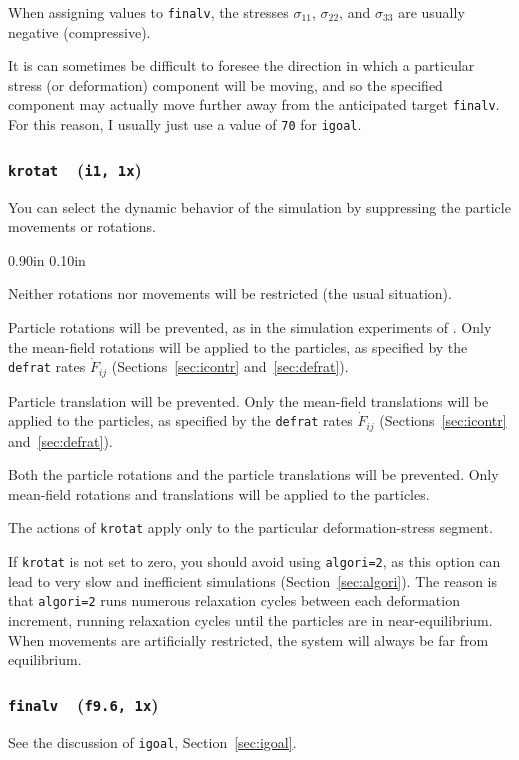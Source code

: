 \documentclass[letterpaper,11pt]{article}
\newcommand{\Var}[2]{\texttt{#1}\ \  (\texttt{#2})}
\newlength{\Labelwidth}
\newcommand{\Entrylabel}[1]{\makebox[\Labelwidth][r]{\texttt{#1}}}
\newenvironment{Options}
{\begin{list}{}{%
\renewcommand{\makelabel}{\Entrylabel}%
\setlength{\leftmargin} {0.90in}%
\setlength{\rightmargin}{0.00in}%
\setlength{\labelsep}   {0.10in}%
\setlength{\labelwidth} {\Labelwidth}%
}}
{\end{list}}
\begin{document}
When assigning values to \texttt{finalv}, the stresses $\sigma_{11}$,
$\sigma_{22}$, and $\sigma_{33}$ are usually negative (compressive).
\par
It is can sometimes be difficult to foresee the direction in which
a particular stress (or deformation) component will be moving,
and so the specified component may actually move further 
away from the anticipated target \texttt{finalv}.
For this reason, I usually just use a value of \texttt{70}
for \texttt{igoal}.
%
\subsubsection[\texttt{krotat}]{\Var{krotat}{i1, 1x}}\label{sec:krotat}
You can select the dynamic behavior of the simulation by suppressing
the particle movements or rotations.
\begin{Options}
\item[krotat=0]
Neither rotations nor movements will be restricted
(the usual situation).
\item[krotat=1]
Particle rotations will be prevented, as in the simulation
experiments of .
Only the mean-field rotations will be applied to the particles,
as specified by the \texttt{defrat} rates $\dot{F}_{ij}$
(Sections~\ref{sec:icontr} and~\ref{sec:defrat}).
\item[krotat=2]
Particle translation will be prevented.
Only the mean-field translations will be applied to the particles,
as specified by the \texttt{defrat} rates $\dot{F}_{ij}$
(Sections~\ref{sec:icontr} and~\ref{sec:defrat}).
\item[krotat=3]
Both the particle rotations and the particle translations
will be prevented.
Only mean-field rotations and translations will be applied to the particles.
\end{Options}
The actions of \texttt{krotat} apply only to the particular deformation-stress
segment.
\par
If \texttt{krotat} is not set to zero,
you should avoid using \texttt{algori=2}, as this option can lead
to very slow and inefficient simulations (Section~\ref{sec:algori}).
The reason is that \texttt{algori=2} runs numerous relaxation cycles
between each deformation increment, running relaxation cycles until the
particles are in near-equilibrium.
When movements are artificially restricted, the system will always be far from
equilibrium.
%
\subsubsection[\texttt{finalv}]{\Var{finalv}{f9.6, 1x}}\label{sec:finalv}
See the discussion of \texttt{igoal}, Section~\ref{sec:igoal}.
%
\end{document}

